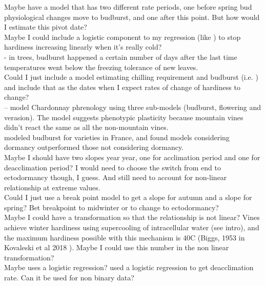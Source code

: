 \documentclass[11pt,letter]{article}
\begin{document}
Maybe have a model that has two different rate periods, one before spring  bud physiological changes move to budburst, and one after this point. But how would I estimate this pivot date? \\

Maybe I could include a logistic component to my regression (like \cite{Ferguson2011}) to stop hardiness increasing linearly when it’s really cold? \\

\cite{Lenz2016} - in trees, budburst happened a certain number of days after the last time temperatures went below the freezing tolerance of new leaves. \\

Could I just include a model estimating chilling requirement and budburst (i.e. \cite{Caffarra2010}) and include that as the dates when I expect rates of change of hardiness to change? \\

\cite{Caffarra2010} – model Chardonnay phrenology using three sub-models (budburst, flowering and verasion). The model suggests phenotypic plasticity because mountain vines didn't react the same as all the non-mountain vines. \\  

\cite{Cortazar-Atauri2009} modeled budburst for varieties in France, and found models considering dormancy outperformed those not considering dormancy. \\  

Maybe I should have two slopes year year, one for acclimation period and one for deacclimation period? I would need to choose the switch from end to ectodormancy though, I guess. And still need to account for non-linear relationship at extreme values. \\ 

Could I just use a break point model to get a slope for autumn and a slope for spring? Bet breakpoint to midwinter or to change to ectodormancy? \\

Maybe I could have a transformation so that the relationship is not linear? Vines achieve winter hardiness using supercooling of intracellular water (see \cite{Kovaleski2018a} intro), and the maximum hardiness possible with this mechanism is 40\textdegree C (Biggs, 1953 in Kovaleski et al 2018 ). Maybe I could use this number in the non linear transformation? \\

Maybe uses a logistic regression? \cite{Kovaleski2018a} used a logistic regression to get deacclimation rate. Can it be used for non binary data?\\
\end{document}
